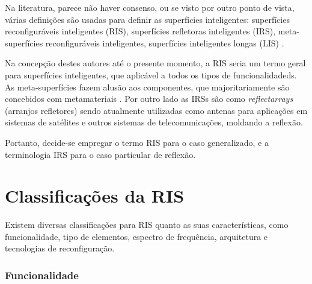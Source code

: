 \documentclass[
	12pt,				%
	openright,			%
	oneside,			%
	a4paper,			%
	english,			%
	brazil				%
	]{abntex2}
\begin{document}
Na literatura, parece não haver consenso, ou se visto por outro ponto de vista, várias definições são usadas para definir as superfícies inteligentes: superfícies reconfiguráveis inteligentes (RIS), superfícies refletoras inteligentes (IRS), meta-superfícies reconfiguráveis inteligentes, superfícies inteligentes longas (LIS) \cite{SDNRIS} . 

Na concepção destes autores até o presente momento, a RIS seria um termo geral para superfícies inteligentes, que aplicável a todos os tipos de funcionalidadeds. As meta-superfícies fazem alusão aos componentes, que majoritariamente são concebidos com metamateriais \cite{SREMetasurface}. Por outro lado as IRSs são como \textit{reflectarrays} (arranjos refletores) sendo atualmente utilizadas como antenas para aplicações em sistemas de satélites e outros sistemas de telecomunicações, moldando a reflexão. 

Portanto, decide-se empregar o termo RIS para o caso generalizado, e a terminologia IRS para o caso particular de reflexão. 

\section{ Classificações da RIS}

Existem diversas classificações para RIS quanto as suas características, como funcionalidade, tipo de elementos, espectro de frequência, arquitetura e tecnologias de reconfiguração.

\subsubsection{Funcionalidade} 
\end{document}
